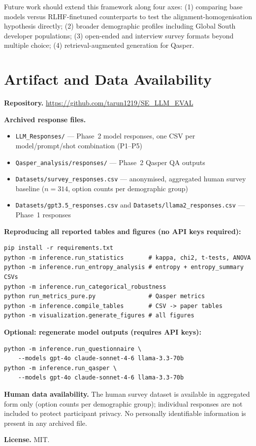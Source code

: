 \documentclass[12pt,a4paper]{article}
\begin{document}
Future work should extend this framework along four axes:
(1) comparing base models versus RLHF-finetuned counterparts to test
the alignment-homogenisation hypothesis directly;
(2) broader demographic profiles including Global South developer
populations;
(3) open-ended and interview survey formats beyond multiple choice;
(4) retrieval-augmented generation for Qasper.

\section*{Artifact and Data Availability}
\label{sec:artifact}

\noindent\textbf{Repository.}
\url{https://github.com/tarun1219/SE_LLM_EVAL}

\noindent\textbf{Archived response files.}
\begin{itemize}[leftmargin=1.4em,itemsep=1pt,topsep=2pt]
  \item \texttt{LLM\_Responses/} --- Phase~2 model responses,
    one CSV per model/prompt/shot combination (P1--P5)
  \item \texttt{Qasper\_analysis/responses/} --- Phase~2 Qasper QA outputs
  \item \texttt{Datasets/survey\_responses.csv} --- anonymised, aggregated
    human survey baseline ($n{=}314$, option counts per demographic group)
  \item \texttt{Datasets/gpt3.5\_responses.csv} and
    \texttt{Datasets/llama2\_responses.csv} --- Phase~1 responses
\end{itemize}

\noindent\textbf{Reproducing all reported tables and figures
(no API keys required):}
\begin{verbatim}
pip install -r requirements.txt
python -m inference.run_statistics       # kappa, chi2, t-tests, ANOVA
python -m inference.run_entropy_analysis # entropy + entropy_summary CSVs
python -m inference.run_categorical_robustness
python run_metrics_pure.py               # Qasper metrics
python -m inference.compile_tables       # CSV -> paper tables
python -m visualization.generate_figures # all figures
\end{verbatim}

\noindent\textbf{Optional: regenerate model outputs (requires API keys):}
\begin{verbatim}
python -m inference.run_questionnaire \
    --models gpt-4o claude-sonnet-4-6 llama-3.3-70b
python -m inference.run_qasper \
    --models gpt-4o claude-sonnet-4-6 llama-3.3-70b
\end{verbatim}

\noindent\textbf{Human data availability.}
The human survey dataset is available in aggregated form only
(option counts per demographic group); individual responses are not
included to protect participant privacy.
No personally identifiable information is present in any archived file.

\noindent\textbf{License.} MIT.



\end{document}
